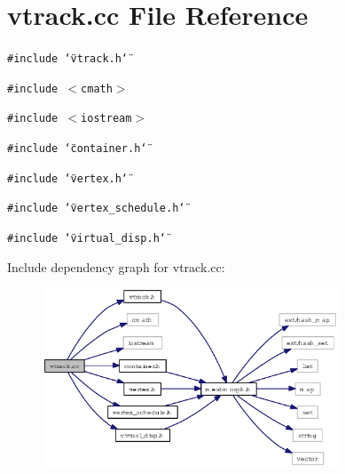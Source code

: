 \section{vtrack.cc File Reference}
\label{vtrack_8cc}
{\tt \#include \char`\"{}vtrack.h\char`\"{}}\par
{\tt \#include $<$cmath$>$}\par
{\tt \#include $<$iostream$>$}\par
{\tt \#include \char`\"{}container.h\char`\"{}}\par
{\tt \#include \char`\"{}vertex.h\char`\"{}}\par
{\tt \#include \char`\"{}vertex\_\-schedule.h\char`\"{}}\par
{\tt \#include \char`\"{}virtual\_\-disp.h\char`\"{}}\par


Include dependency graph for vtrack.cc:\begin{figure}[H]
\begin{center}
\leavevmode
\includegraphics[width=250pt]{vtrack_8cc__incl}
\end{center}
\end{figure}
